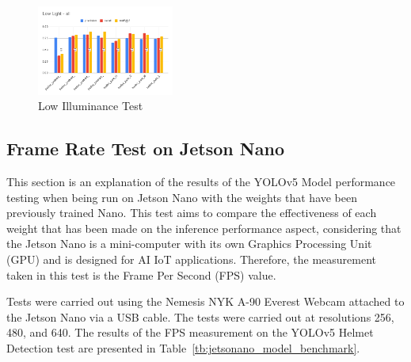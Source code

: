 \begin{figure}[ht]
  \centering
  \includegraphics[width=0.4\textwidth]{gambar/utilities/lowlight_test.png}
  \caption{Low Illuminance Test}
  \label{fig:lowillum_test}  
\end{figure}

\subsection{Frame Rate Test on Jetson Nano}
\label{subsec:model_jetsonnano_test}

\par This section is an explanation of the results of the YOLOv5 Model performance testing when being run on Jetson Nano with the weights that have been previously trained Nano. This test aims to compare the effectiveness of each weight that has been made on the inference performance aspect, considering that the Jetson Nano is a mini-computer with its own Graphics Processing Unit (GPU) and is designed for AI IoT applications. Therefore, the measurement taken in this test is the Frame Per Second (FPS) value.

 
\par Tests were carried out using the Nemesis NYK A-90 Everest Webcam attached to the Jetson Nano via a USB cable. The tests were carried out at resolutions 256, 480, and 640. The results of the FPS measurement on the YOLOv5 Helmet Detection test are presented in Table~\ref{tb:jetsonano_model_benchmark}.

